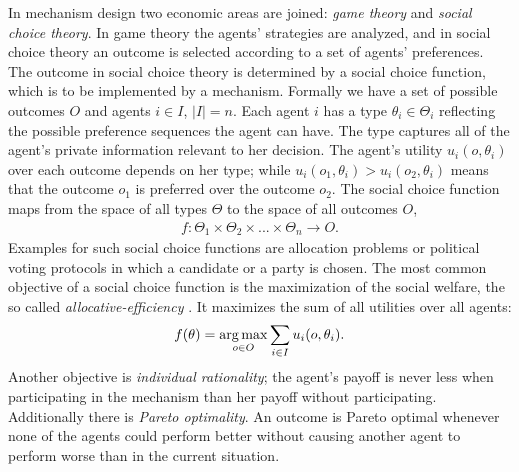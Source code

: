 In mechanism design two economic areas are joined: \emph{game
theory} and \emph{social choice theory}. In game theory the
agents' strategies are analyzed, and in social choice theory an
outcome is selected according to a set of agents' preferences. The
outcome in social choice theory is determined by a social choice
function, which is to be implemented by a mechanism. Formally we
have a set of possible outcomes $O$ and agents $i \in I$, $|I|=n$.
Each agent $i$ has a type $\theta_i \in \Theta_i$ reflecting the
possible preference sequences the agent can have. The type captures
all of the agent's private information relevant to her decision.
The agent's utility $u_i(o,\theta_i)$ over each outcome depends on
her type; while $u_i(o_1,\theta_i)>u_i(o_2,\theta_i)$ means that
the outcome $o_1$ is preferred over the outcome $o_2$. The social
choice function maps from the space of all types $\Theta$ to the
space of all outcomes $O$,
\begin{eqnarray}
  f:\Theta_1 \times\Theta_2\times...\times\Theta_n\rightarrow O.
\end{eqnarray}
Examples for such social choice functions are allocation problems or political voting
protocols in which a candidate or a party is chosen. The most common objective of a social choice function is
the maximization of the social welfare, the so called
\emph{allocative-efficiency} \parencite{Pa01}. It maximizes the sum of
all utilities over all agents:
\begin{eqnarray}
\label{Efficient}
  f(\theta)=\operatorname*{arg\,max}_{o \in O} \sum_{i \in I} u_i(o,\theta_i).
\end{eqnarray}
Another objective is \emph{individual rationality}; the agent's
payoff is never less when participating in the mechanism than her
payoff without participating. Additionally there is \emph{Pareto
optimality}. An outcome is Pareto optimal whenever none of the
agents could perform better without causing another agent to
perform worse than in the current situation.

